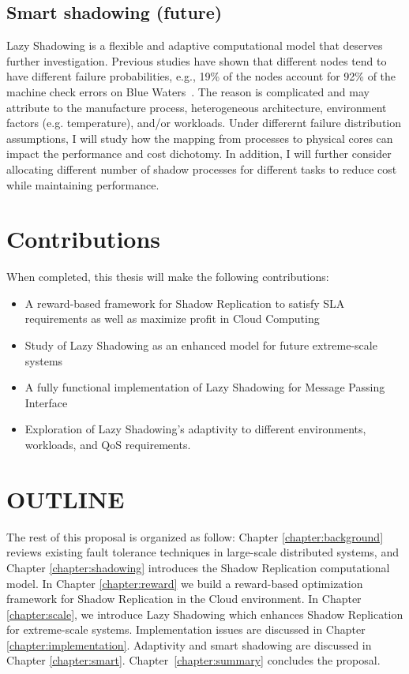 \subsection{Smart shadowing (future)}
Lazy Shadowing is a flexible and adaptive computational model that deserves further investigation. Previous studies have shown that 
different nodes tend to have different failure probabilities, e.g., 19\% of the nodes account for 92\% of the machine check errors on Blue Waters~\cite{di2014lessons}. The reason 
is complicated and may attribute to the manufacture process, heterogeneous architecture, environment factors (e.g. temperature), 
and/or workloads. %
Under differernt failure distribution assumptions, I will study how the mapping from processes to physical cores can impact the performance and cost dichotomy. 
In addition, I will further consider allocating different number of shadow processes for different tasks to reduce cost while 
maintaining performance. 

\section{Contributions}
When completed, this thesis will make the following contributions:

\begin{itemize}
\item A reward-based framework for Shadow Replication to satisfy SLA requirements as well as maximize profit in Cloud Computing
\item Study of Lazy Shadowing as an enhanced model for future extreme-scale systems
\item A fully functional implementation of Lazy Shadowing for Message Passing Interface
\item Exploration of Lazy Shadowing's adaptivity to different environments, workloads, and QoS requirements. 
\end{itemize}


\section{OUTLINE}
\label{outline}
The rest of this proposal is organized as follow:  
Chapter \ref{chapter:background} reviews existing fault tolerance techniques in large-scale distributed systems, 
and Chapter \ref{chapter:shadowing} introduces the Shadow Replication computational model. In Chapter \ref{chapter:reward} we build a reward-based optimization framework for Shadow Replication in the Cloud environment.
In Chapter \ref{chapter:scale}, we introduce Lazy Shadowing which enhances Shadow Replication for extreme-scale systems. 
Implementation issues are discussed in Chapter \ref{chapter:implementation}. Adaptivity and smart shadowing are discussed in Chapter \ref{chapter:smart}.
Chapter~\ref{chapter:summary}  concludes the proposal.








